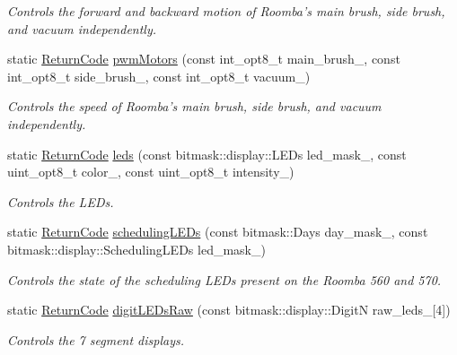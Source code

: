 \begin{DoxyCompactItemize}
\begin{DoxyCompactList}\small\item\em Controls the forward and backward motion of Roomba’s main brush, side brush, and vacuum independently. \end{DoxyCompactList}\item 
static \hyperlink{namespaceroomba_aff53babe0af88b1ea8b066fd18b8f23f}{Return\+Code} \hyperlink{classroomba_1_1_open_interface_a9f06b7383b8bd52a67852deabe57f5c3}{pwm\+Motors} (const int\+\_\+opt8\+\_\+t main\+\_\+brush\+\_\+, const int\+\_\+opt8\+\_\+t side\+\_\+brush\+\_\+, const int\+\_\+opt8\+\_\+t vacuum\+\_\+)
\begin{DoxyCompactList}\small\item\em Controls the speed of Roomba’s main brush, side brush, and vacuum independently. \end{DoxyCompactList}\item 
static \hyperlink{namespaceroomba_aff53babe0af88b1ea8b066fd18b8f23f}{Return\+Code} \hyperlink{classroomba_1_1_open_interface_a09097660a8be86d23088953e42ce27bc}{leds} (const bitmask\+::display\+::\+L\+E\+Ds led\+\_\+mask\+\_\+, const uint\+\_\+opt8\+\_\+t color\+\_\+, const uint\+\_\+opt8\+\_\+t intensity\+\_\+)
\begin{DoxyCompactList}\small\item\em Controls the L\+E\+Ds. \end{DoxyCompactList}\item 
static \hyperlink{namespaceroomba_aff53babe0af88b1ea8b066fd18b8f23f}{Return\+Code} \hyperlink{classroomba_1_1_open_interface_a94b70a10f5971ee23fa8990a2fc86d23}{scheduling\+L\+E\+Ds} (const bitmask\+::\+Days day\+\_\+mask\+\_\+, const bitmask\+::display\+::\+Scheduling\+L\+E\+Ds led\+\_\+mask\+\_\+)
\begin{DoxyCompactList}\small\item\em Controls the state of the scheduling L\+E\+Ds present on the Roomba 560 and 570. \end{DoxyCompactList}\item 
static \hyperlink{namespaceroomba_aff53babe0af88b1ea8b066fd18b8f23f}{Return\+Code} \hyperlink{classroomba_1_1_open_interface_a80fd30bc2c3e989058290e4c949bbb20}{digit\+L\+E\+Ds\+Raw} (const bitmask\+::display\+::\+Digit\+N raw\+\_\+leds\+\_\+\mbox{[}4\mbox{]})
\begin{DoxyCompactList}\small\item\em Controls the 7 segment displays. \end{DoxyCompactList}\item 

\end{DoxyCompactItemize}
